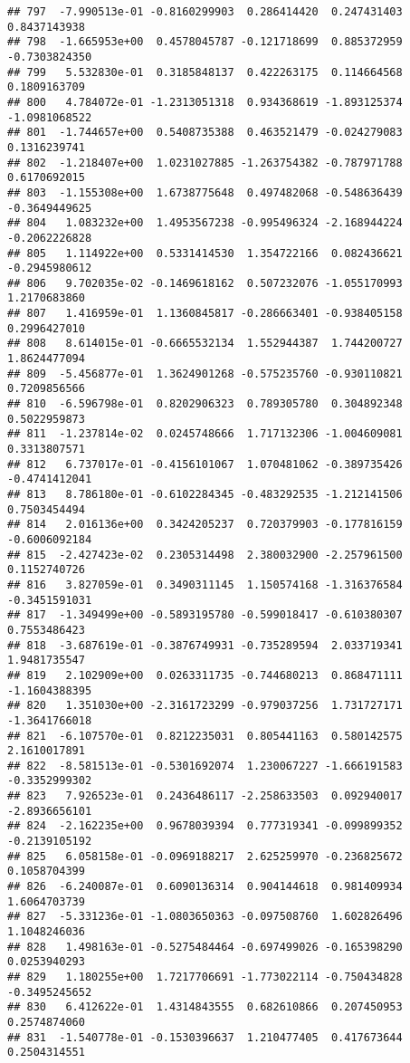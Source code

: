 \documentclass[
]{article}
\begin{document}
\begin{verbatim}
## 797  -7.990513e-01 -0.8160299903  0.286414420  0.247431403  0.8437143938
## 798  -1.665953e+00  0.4578045787 -0.121718699  0.885372959 -0.7303824350
## 799   5.532830e-01  0.3185848137  0.422263175  0.114664568  0.1809163709
## 800   4.784072e-01 -1.2313051318  0.934368619 -1.893125374 -1.0981068522
## 801  -1.744657e+00  0.5408735388  0.463521479 -0.024279083  0.1316239741
## 802  -1.218407e+00  1.0231027885 -1.263754382 -0.787971788  0.6170692015
## 803  -1.155308e+00  1.6738775648  0.497482068 -0.548636439 -0.3649449625
## 804   1.083232e+00  1.4953567238 -0.995496324 -2.168944224 -0.2062226828
## 805   1.114922e+00  0.5331414530  1.354722166  0.082436621 -0.2945980612
## 806   9.702035e-02 -0.1469618162  0.507232076 -1.055170993  1.2170683860
## 807   1.416959e-01  1.1360845817 -0.286663401 -0.938405158  0.2996427010
## 808   8.614015e-01 -0.6665532134  1.552944387  1.744200727  1.8624477094
## 809  -5.456877e-01  1.3624901268 -0.575235760 -0.930110821  0.7209856566
## 810  -6.596798e-01  0.8202906323  0.789305780  0.304892348  0.5022959873
## 811  -1.237814e-02  0.0245748666  1.717132306 -1.004609081  0.3313807571
## 812   6.737017e-01 -0.4156101067  1.070481062 -0.389735426 -0.4741412041
## 813   8.786180e-01 -0.6102284345 -0.483292535 -1.212141506  0.7503454494
## 814   2.016136e+00  0.3424205237  0.720379903 -0.177816159 -0.6006092184
## 815  -2.427423e-02  0.2305314498  2.380032900 -2.257961500  0.1152740726
## 816   3.827059e-01  0.3490311145  1.150574168 -1.316376584 -0.3451591031
## 817  -1.349499e+00 -0.5893195780 -0.599018417 -0.610380307  0.7553486423
## 818  -3.687619e-01 -0.3876749931 -0.735289594  2.033719341  1.9481735547
## 819   2.102909e+00  0.0263311735 -0.744680213  0.868471111 -1.1604388395
## 820   1.351030e+00 -2.3161723299 -0.979037256  1.731727171 -1.3641766018
## 821  -6.107570e-01  0.8212235031  0.805441163  0.580142575  2.1610017891
## 822  -8.581513e-01 -0.5301692074  1.230067227 -1.666191583 -0.3352999302
## 823   7.926523e-01  0.2436486117 -2.258633503  0.092940017 -2.8936656101
## 824  -2.162235e+00  0.9678039394  0.777319341 -0.099899352 -0.2139105192
## 825   6.058158e-01 -0.0969188217  2.625259970 -0.236825672  0.1058704399
## 826  -6.240087e-01  0.6090136314  0.904144618  0.981409934  1.6064703739
## 827  -5.331236e-01 -1.0803650363 -0.097508760  1.602826496  1.1048246036
## 828   1.498163e-01 -0.5275484464 -0.697499026 -0.165398290  0.0253940293
## 829   1.180255e+00  1.7217706691 -1.773022114 -0.750434828 -0.3495245652
## 830   6.412622e-01  1.4314843555  0.682610866  0.207450953  0.2574874060
## 831  -1.540778e-01 -0.1530396637  1.210477405  0.417673644  0.2504314551

\end{verbatim}
\end{document}
